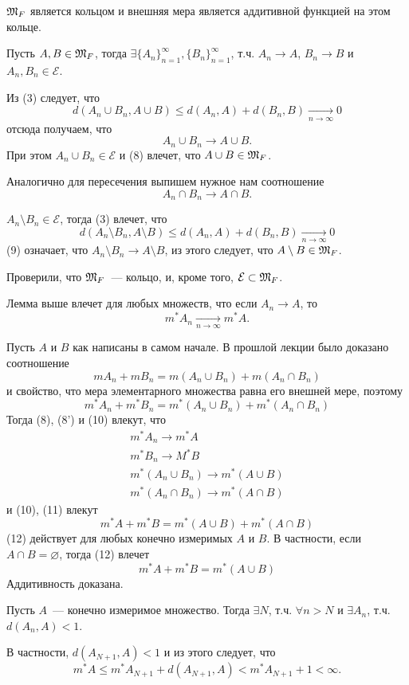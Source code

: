 \documentclass[main]{subfiles}
\begin{document}
\begin{theorem}
    $\mathfrak{M}_F$ является кольцом и внешняя мера является аддитивной функцией на этом кольце.
\end{theorem}
\begin{longProof}
    Пусть $A, B \in \mathfrak{M}_F$, тогда $\exists \{A_n\}_{n=1}^\infty, \{B_n\}_{n=1}^\infty$, т.ч. $A_n \to A$, $B_n \to B$ и $A_n, B_n \in \mathcal{E}$.

    Из (3) следует, что
    \[d(A_n \cup B_n, A \cup B) \le d(A_n, A) + d(B_n, B) \xrightarrow[n \to \infty]{} 0\]
    отсюда получаем, что
    \[A_n \cup B_n \to A \cup B. \tag{8}\]
    При этом $A_n \cup B_n \in \mathcal{E}$ и (8) влечет, что $A \cup B \in \mathfrak{M}_F$.

    Аналогично для пересечения выпишем нужное нам соотношение
    \[A_n \cap B_n \to A \cap B. \tag{8'}\]

    $A_n \setminus B_n \in \mathcal{E}$, тогда (3) влечет, что
    \[d(A_n \setminus B_n, A \setminus B) \le d(A_n, A) + d(B_n, B) \xrightarrow[n \to \infty]{} 0 \tag{9}\]
    (9) означает, что $A_n \setminus B_n \to A \setminus B$, из этого следует, что $A \setminus B \in \mathfrak{M}_F$.

    Проверили, что $\mathfrak{M}_F$~--- кольцо, и, кроме того, $\mathcal{E} \subset \mathfrak{M}_F$.

    Лемма выше влечет для любых множеств, что если $A_n \to A$, то
    \[m^*A_n \xrightarrow[n \to \infty]{} m^*A. \tag{10'}\]

    Пусть $A$ и $B$ как написаны в самом начале.
    В прошлой лекции было доказано соотношение
    \[mA_n + mB_n = m(A_n \cup B_n) + m(A_n \cap B_n)\]
    и свойство, что мера элементарного множества равна его внешней мере, поэтому
    \[m^*A_n + m^*B_n = m^*(A_n \cup B_n) + m^*(A_n \cap B_n) \tag{10}\]
    Тогда (8), (8') и (10) влекут, что
    \[\begin{gathered}
            m^*A_n \to m^*A \\
            m^*B_n \to M^*B \\
            m^*(A_n \cup B_n) \to m^*(A \cup B) \\
            m^*(A_n \cap B_n) \to m^*(A \cap B)
        \end{gathered} \tag{11}\]
    и (10), (11) влекут
    \[m^*A + m^*B = m^*(A \cup B) + m^*(A \cap B) \tag{12}\]
    (12) действует для любых конечно измеримых $A$ и $B$.
    В частности, если $A \cap B = \varnothing$, тогда (12) влечет
    \[m^*A + m^*B = m^*(A \cup B) \tag{13}\]
    Аддитивность доказана.
\end{longProof}
\begin{remark}
    Пусть $A$~--- конечно измеримое множество.
    Тогда $\exists N$, т.ч. $\forall n > N$ и $\exists A_n$, т.ч. $d(A_n, A) < 1$.

    В частности, $d(A_{N+1}, A) < 1$ и из этого следует, что
    \[m^*A \le m^*A_{N+1} + d(A_{N+1}, A) < m^*A_{N+1} +1 < \infty.\]
\end{remark}
\end{document}
